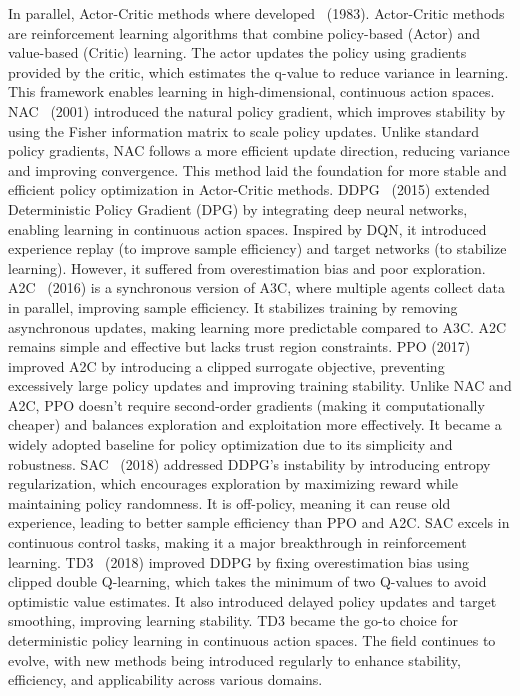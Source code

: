In parallel, Actor-Critic methods where developed~\cite{barto1983neuronlike} (1983).
Actor-Critic methods are reinforcement learning algorithms that combine policy-based (Actor) and value-based (Critic)
learning.
The actor updates the policy using gradients provided by the critic, which estimates the q-value to reduce variance in
learning.
This framework enables learning in high-dimensional, continuous action spaces.
%
NAC~\citep{kakade2001natural} (2001) introduced the natural policy gradient, which improves stability by using the
Fisher information matrix to scale policy updates.
Unlike standard policy gradients, NAC follows a more efficient update direction, reducing variance and improving
convergence.
This method laid the foundation for more stable and efficient policy optimization in Actor-Critic methods.
%
DDPG~\citep{lillicrap2015continuous} (2015) extended Deterministic Policy Gradient (DPG) by integrating deep neural
networks, enabling learning in continuous action spaces.
Inspired by DQN, it introduced experience replay (to improve sample efficiency) and target networks
(to stabilize learning).
However, it suffered from overestimation bias and poor exploration.
%
A2C~\citep{mnih2016asynchronous} (2016) is a synchronous version of A3C, where multiple agents collect data in parallel,
improving sample efficiency.
It stabilizes training by removing asynchronous updates, making learning more predictable compared to A3C.
A2C remains simple and effective but lacks trust region constraints.
%
PPO\citep{schulman2017proximal} (2017) improved A2C by introducing a clipped surrogate objective, preventing excessively large
policy updates and improving training stability.
Unlike NAC and A2C, PPO doesn't require second-order gradients (making it computationally cheaper) and balances
exploration and exploitation more effectively.
It became a widely adopted baseline for policy optimization due to its simplicity and robustness.
%
SAC~\citep{haarnoja2018soft} (2018) addressed DDPG's instability by introducing entropy regularization, which encourages
exploration by maximizing reward while maintaining policy randomness.
It is off-policy, meaning it can reuse old experience, leading to better sample efficiency than PPO and A2C.
SAC excels in continuous control tasks, making it a major breakthrough in reinforcement learning.
%
TD3~\citep{fujimoto2018addressing} (2018) improved DDPG by fixing overestimation bias using clipped double Q-learning,
which takes the minimum of two Q-values to avoid optimistic value estimates.
It also introduced delayed policy updates and target smoothing, improving learning stability.
TD3 became the go-to choice for deterministic policy learning in continuous action spaces.
%
%
The field continues to evolve, with new methods being introduced regularly to enhance stability, efficiency, and
applicability across various domains.

